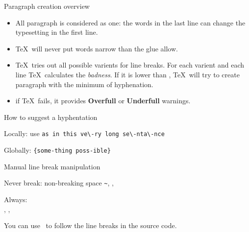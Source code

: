 \begin{frame}{Paragraph creation overview\preMagicPage}\relax
    \begin{itemize}
        \item All paragraph is considered as one: the words in the last line can change the typesetting in the first line.
        \item \TeX\ will never put words narrow than the glue allow.
        \item \TeX\ tries out all possible varients for line breaks. For each varient and each line \TeX\ calculates the \textit{badness}. If it is lower than \ccol\tolerance, \TeX\ will try to create paragraph with the minimum of hyphenation.
        \item if \TeX\ fails, it provides \textbf{Overfull} or \textbf{Underfull} warnings.
    \end{itemize}
\end{frame}

\begin{frame}[fragile]{How to suggest a hyphentation\magicPage}\relax

    Locally: use \ccol\- \verb|as in this ve\-ry long se\-nta\-nce|
    
    Globally: \ccol\hyphenation\verb|{some-thing poss-ible}|
    
    \cprotect{}
\end{frame}

\begin{frame}[fragile]{Manual line break manipulation\magicPage}\relax

    Never break: non-breaking space \verb|~|, \ccol\nobreak, \ccol\nolinebreak
    
    Always: \ccol\\, \ccol\break, \ccol\linebreak
    
    You can use \ccol\obeylines\ to follow the line breaks in the source code.
     
\end{frame}

